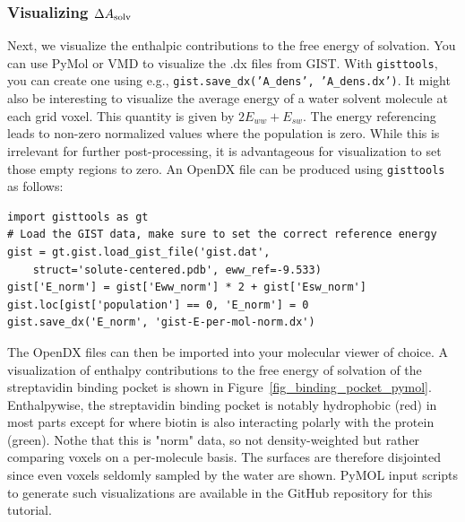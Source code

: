 \documentclass[9pt,tutorial]{livecoms}
\newcommand{\dasolv}{\Delta A_\textup{solv}}
\newcommand{\software}{\texttt}
\newcommand\inlinecode{\texttt}
\begin{document}
\subsubsection{Visualizing $\dasolv$}
Next, we visualize the enthalpic contributions to the free energy of solvation.
You can use PyMol\cite{pymol} or VMD\cite{vmd} to visualize the .dx files from GIST\@.
With \software{gisttools}, you can create one using e.g., \inlinecode{gist.save\_dx('A\_dens', 'A\_dens.dx')}.
It might also be interesting to visualize the average energy of a water solvent molecule at each grid voxel.
This quantity is given by $2E_{ww} + E_{sw}$.
The energy referencing leads to non-zero normalized values where the population is zero.
While this is irrelevant for further post-processing, it is advantageous for visualization to set those empty regions to zero.
An OpenDX file can be produced using \software{gisttools} as follows:

\begin{lstlisting}[style=python]
import gisttools as gt
# Load the GIST data, make sure to set the correct reference energy
gist = gt.gist.load_gist_file('gist.dat',
    struct='solute-centered.pdb', eww_ref=-9.533)
gist['E_norm'] = gist['Eww_norm'] * 2 + gist['Esw_norm']
gist.loc[gist['population'] == 0, 'E_norm'] = 0
gist.save_dx('E_norm', 'gist-E-per-mol-norm.dx')
\end{lstlisting}
The OpenDX files can then be imported into your molecular viewer of choice.
A visualization of enthalpy contributions to the free energy of solvation of the streptavidin binding pocket is shown in Figure~\ref{fig_binding_pocket_pymol}. 
Enthalpywise, the streptavidin binding pocket is notably hydrophobic (red) in most parts except for where biotin is also interacting polarly with the protein (green).
Nothe that this is "norm" data, so not density-weighted but rather comparing voxels on a per-molecule basis.
The surfaces are therefore disjointed since even voxels seldomly sampled by the water are shown.
PyMOL input scripts to generate such visualizations are available in the GitHub repository for this tutorial.
\end{document}
